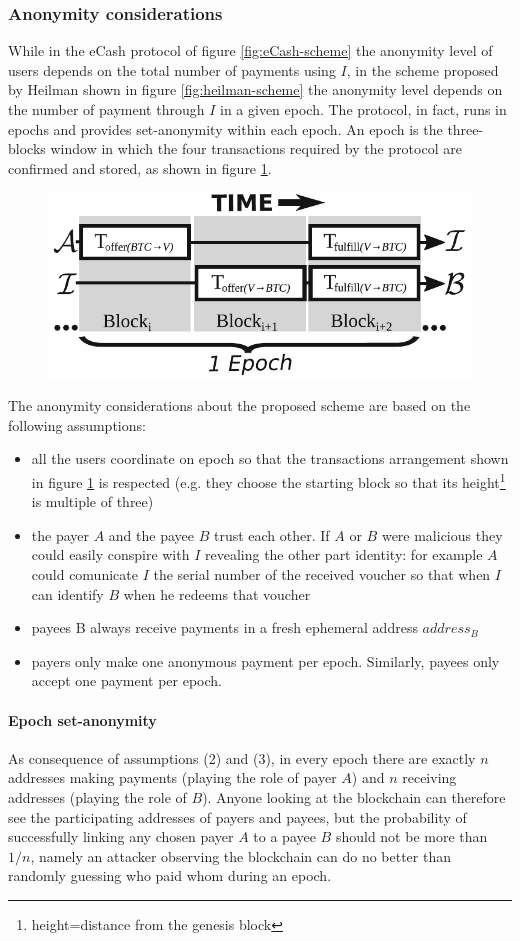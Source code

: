 \subsubsection{Anonymity considerations} While in the eCash protocol of figure
\ref{fig:eCash-scheme} the anonymity level of users depends on the total number
of payments using $I$, in the scheme proposed by Heilman shown in figure \ref{fig:heilman-scheme} the anonymity level
depends on the number of payment through $I$ in a given epoch. The protocol, in
fact, runs in epochs and provides set-anonymity within each epoch. An epoch is the
three-blocks window in which the four transactions required by the protocol are
confirmed and stored, as shown in figure \ref{fig:epochs}.
\begin{figure}[!htb]
	\centering
	\includegraphics[width=0.6\linewidth]{img/epochs.png}
	\caption{}
	\label{fig:epochs}
\end{figure}

The anonymity considerations about the proposed scheme are based on the following
assumptions:
\begin{itemize}
  \item all the users coordinate on epoch so that the transactions arrangement
  shown in figure \ref{fig:epochs} is respected (e.g. they choose the starting
  block so that its height\footnote{height=distance from the genesis block}
  is multiple of three)
  \item the payer $A$ and the payee $B$ trust each other. If $A$ or $B$ were malicious
  they could easily conspire with $I$ revealing the other part identity: for example
  $A$ could comunicate $I$ the serial number of the received voucher so that when
  $I$ can identify $B$ when he redeems that voucher
  \item payees B always receive payments in a fresh ephemeral address $address_B$
  \item payers only make one anonymous payment per epoch. Similarly, payees only
  accept one payment per epoch.
\end{itemize}

\paragraph{Epoch set-anonymity} As consequence of assumptions (2) and (3), in
every epoch there are exactly $n$ addresses making payments (playing the role of
payer $A$) and $n$ receiving addresses (playing the role of $B$). Anyone looking
at the blockchain can therefore see the participating addresses of payers and
payees, but the probability of successfully linking any chosen payer $A$ to a
payee $B$ should not be more than $1/n$, namely an attacker observing the
blockchain can do no better than randomly guessing who paid whom during an epoch.

